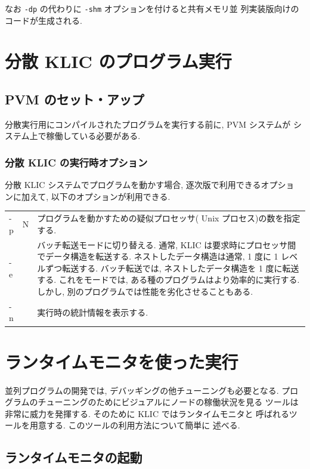 \documentclass[a4,titlepage]{jsreport}
\begin{document}
なお {\tt -dp} の代わりに {\tt -shm} オプションを付けると共有メモリ並
列実装版向けのコードが生成される.

\section{分散 KLIC のプログラム実行}

\subsection{PVM のセット・アップ}

分散実行用にコンパイルされたプログラムを実行する前に,  PVM システムが
システム上で稼働している必要がある.  

\subsubsection{分散 KLIC の実行時オプション}

分散 KLIC システムでプログラムを動かす場合, 逐次版で利用できるオプショ
ンに加えて, 以下のオプションが利用できる.   

\begin{tabular}{llp{10cm}}
-p&N&
プログラムを動かすための疑似プロセッサ( Unix プロセス)の数を指定する.  \\
-e&&
バッチ転送モードに切り替える.  
通常,  KLIC は要求時にプロセッサ間でデータ構造を転送する.  
ネストしたデータ構造は通常, 1 度に 1 レベルずつ転送する.  
バッチ転送では, ネストしたデータ構造を 1 度に転送する.  
これをモードでは, ある種のプログラムはより効率的に実行する.  
しかし, 別のプログラムでは性能を劣化させることもある.  \\
-n&&
実行時の統計情報を表示する.  \\
\end{tabular}

\section{ランタイムモニタを使った実行}

並列プログラムの開発では, デバッギングの他チューニングも必要となる.
プログラムのチューニングのためにビジュアルにノードの稼働状況を見る
ツールは非常に威力を発揮する.  そのために KLIC ではランタイムモニタと
呼ばれるツールを用意する.  このツールの利用方法について簡単に
述べる.

\subsection{ランタイムモニタの起動}
\end{document}
